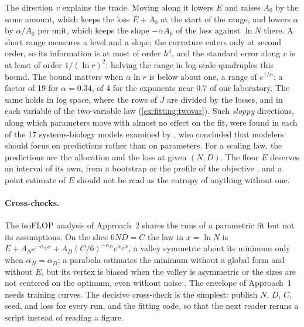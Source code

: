 \begin{refsection}
The direction $v$ explains the trade. Moving along it lowers $E$ and raises $A_0$ by the same amount, which keeps the loss $E+A_0$ at the start of the range, and lowers $\alpha$ by $\alpha/A_0$ per unit, which keeps the slope $-\alpha A_0$ of the loss against $\ln N$ there. A short range measures a level and a slope; the curvature enters only at second order, so its information is at most of order $h^4$, and the standard error along $v$ is at least of order $1/(\ln r)^2$: halving the range in log scale quadruples this bound. The bound matters when $\alpha\ln r$ is below about one, a range of $e^{1/\alpha}$: a factor of 19 for $\alpha=0.34$, of 4 for the exponents near $0.7$ of our laboratory. The same holds in log space, where the rows of $J$ are divided by the losses, and in each variable of the two-variable law (\cref{ex:fitting:twovar}). Such \emph{sloppy} directions, along which parameters move with almost no effect on the fit, were found in each of the 17 systems-biology models examined by \textcite{GutenkunstEtAl2007}, who concluded that modelers should focus on predictions rather than on parameters. For a scaling law, the predictions are the allocation and the loss at given $(N,D)$. The floor $E$ deserves an interval of its own, from a bootstrap or the profile of the objective \parencite{BatesWatts1988}, and a point estimate of $E$ should not be read as the entropy of anything without one.

\paragraph{Cross-checks.} The isoFLOP analysis of Approach~2 shares the runs of a parametric fit but not its assumptions. On the slice $6ND=C$ the law in $x=\ln N$ is $E+A_Ne^{-\alpha_Nx}+A_D(C/6)^{-\alpha_D}e^{\alpha_Dx}$, a valley symmetric about its minimum only when $\alpha_N=\alpha_D$; a parabola estimates the minimum without a global form and without $E$, but its vertex is biased when the valley is asymmetric or the sizes are not centered on the optimum, even without noise \parencite{CzechEtAl2026}. The envelope of Approach~1 needs training curves. The decisive cross-check is the simplest: publish $N$, $D$, $C$, seed, and loss for every run, and the fitting code, so that the next reader reruns a script instead of reading a figure.


\end{refsection}
